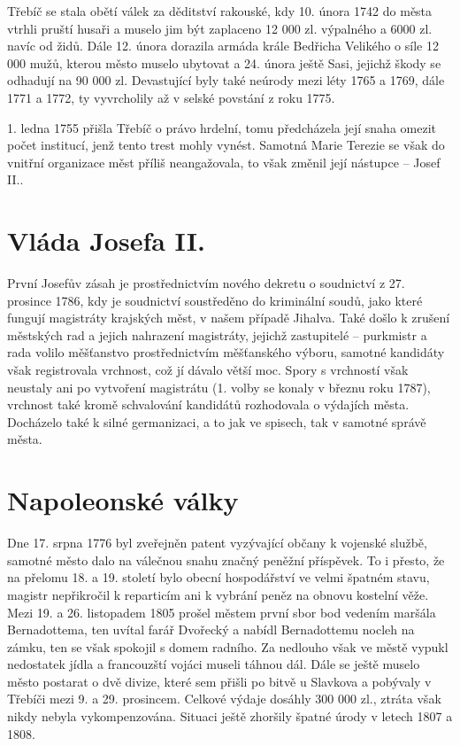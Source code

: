 \documentclass[a4paper,oneside,12p]{report}
\begin{document}
Třebíč se stala obětí válek za děditství rakouské, kdy 10. února 1742 do města vtrhli pruští husaři a muselo jim být zaplaceno 12 000 zl. výpalného a 6000 zl. navíc od židů.
Dále 12. února dorazila armáda  krále Bedřicha Velikého o síle 12 000 mužů, kterou město muselo ubytovat a 24. února ještě Sasi, jejichž škody se odhadují na 90 000 zl.
Devastující byly také neúrody mezi léty 1765 a 1769, dále 1771 a 1772, ty vyvrcholily až v selské povstání z roku 1775. %

1. ledna 1755 přišla Třebíč o právo hrdelní, tomu předcházela její snaha omezit počet institucí, jenž tento trest mohly vynést.
Samotná Marie Terezie se však do vnitřní organizace měst příliš neangažovala, to však změnil její nástupce -- Josef II.. %

\section{Vláda Josefa II.}

První Josefův zásah je prostřednictvím nového dekretu o soudnictví z 27. prosince 1786, kdy je soudnictví soustředěno do kriminální soudů, jako které fungují magistráty krajských měst, v našem případě Jihalva.
Také došlo k zrušení městských rad a jejich nahrazení magistráty, jejichž zastupitelé -- purkmistr a rada volilo měšťanstvo prostřednictvím měšťanského výboru, samotné kandidáty však registrovala vrchnost, což jí dávalo větší moc.
Spory s vrchností však neustaly ani po vytvoření magistrátu (1. volby se konaly v březnu roku 1787), vrchnost také kromě schvalování kandidátů rozhodovala o výdajích města.
Docházelo také k silné germanizaci, a to jak ve spisech, tak v samotné správě města. %

\section{Napoleonské války}

Dne 17. srpna 1776 byl zveřejněn patent vyzývající občany k vojenské službě, samotné město dalo na válečnou snahu značný peněžní příspěvek.
To i přesto, že na přelomu 18. a 19. století bylo obecní hospodářství ve velmi špatném stavu, magistr nepřikročil k reparticím ani k vybrání peněz na obnovu kostelní věže.
Mezi 19. a 26. listopadem 1805 prošel městem první sbor bod vedením maršála Bernadottema, ten uvítal farář Dvořecký a nabídl Bernadottemu nocleh na zámku, ten se však spokojil s domem radního.
Za nedlouho však ve městě vypukl nedostatek jídla a francouzští vojáci museli táhnou dál.
Dále se ještě muselo město postarat o dvě divize, které sem přišli po bitvě u Slavkova a  pobývaly v Třebíči mezi 9. a 29. prosincem.
Celkové výdaje dosáhly 300 000 zl., ztráta však nikdy nebyla vykompenzována.
Situaci ještě zhoršily špatné úrody v letech 1807 a 1808. %
\end{document}
